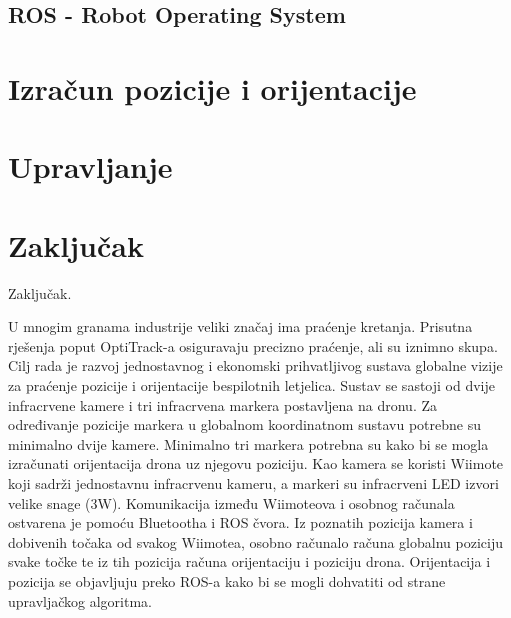 \documentclass[times, utf8, diplomski]{fer}
\begin{document}
\section{ROS - Robot Operating System}

\chapter{Izračun pozicije i orijentacije}



\chapter{Upravljanje}

\chapter{Zaključak}
Zaključak.




\begin{sazetak}
U mnogim granama industrije veliki značaj ima praćenje kretanja. Prisutna rješenja poput OptiTrack-a osiguravaju precizno praćenje, ali su iznimno skupa. Cilj rada je razvoj jednostavnog i ekonomski prihvatljivog sustava globalne vizije za praćenje pozicije i orijentacije bespilotnih letjelica. Sustav se sastoji od dvije infracrvene kamere i tri infracrvena markera postavljena na dronu. Za određivanje pozicije markera u globalnom koordinatnom sustavu potrebne su minimalno dvije kamere. Minimalno tri markera potrebna su kako bi se mogla izračunati orijentacija drona uz njegovu poziciju. Kao kamera se koristi Wiimote koji sadrži jednostavnu infracrvenu kameru, a markeri su infracrveni LED izvori velike snage (3W). Komunikacija između Wiimoteova i osobnog računala ostvarena je pomoću Bluetootha i ROS čvora. Iz poznatih pozicija kamera i dobivenih točaka od svakog Wiimotea, osobno računalo računa globalnu poziciju svake točke te iz tih pozicija računa orijentaciju i poziciju drona. Orijentacija i pozicija se objavljuju preko ROS-a kako bi se mogli dohvatiti od strane upravljačkog algoritma. 

\end{sazetak}
\newpage
\end{document}
